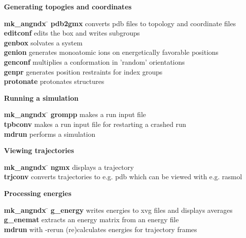 \begin{description}
\item {\large\bf Generating topogies and coordinates}
\begin{tabbing}
{\bf mk\_angndx} \= \kill
{\bf pdb2gmx} \> converts pdb files to topology and coordinate files  \\
{\bf editconf} \> edits the box and writes subgroups  \\
{\bf genbox} \> solvates a system \\
{\bf genion} \> generates monoatomic ions on energetically favorable positions \\
{\bf genconf} \> multiplies a conformation in 'random' orientations \\
{\bf genpr} \> generates position restraints for index groups \\
{\bf protonate} \> protonates structures \\
\end{tabbing}

\item {\large\bf Running a simulation}
\begin{tabbing}
{\bf mk\_angndx} \= \kill
{\bf grompp} \> makes a run input file \\
{\bf tpbconv} \> makes a run input file for restarting a crashed run \\
{\bf mdrun} \> performs a simulation \\
\end{tabbing}

\item {\large\bf Viewing trajectories}
\begin{tabbing}
{\bf mk\_angndx} \= \kill
{\bf ngmx} \> displays a trajectory \\
{\bf trjconv} \> converts trajectories to e.g. pdb which can be viewed with e.g. rasmol \\
\end{tabbing}

\item {\large\bf Processing energies}
\begin{tabbing}
{\bf mk\_angndx} \= \kill
{\bf g\_energy} \> writes energies to xvg files and displays averages \\
{\bf g\_enemat} \> extracts an energy matrix from an energy file \\
{\bf mdrun} \> with -rerun (re)calculates energies for trajectory frames \\
\end{tabbing}


\end{description}
